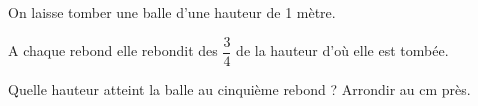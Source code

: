 
\medskip

On laisse tomber une balle d'une hauteur de 1 mètre. 
 
A chaque rebond elle rebondit des $\dfrac{3}{4}$ de la hauteur d'où elle est tombée.
 
Quelle hauteur atteint la balle au cinquième rebond ? Arrondir au cm près. 

\bigskip

